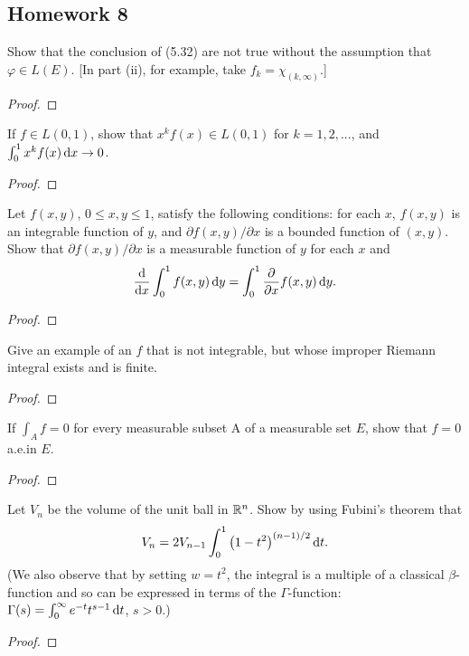 \subsection{Homework 8}
\begin{problem}
Show that the conclusion of (5.32) are not true without the assumption that
$\varphi\in L(E)$. [In part (ii), for example, take $f_k=\chi_{(k,\infty)}$.]
\end{problem}
\begin{proof}
\end{proof}

\begin{problem}
If $f\in L(0,1)$, show that $x^kf(x)\in L(0,1)$ for $k=1,2,...$, and
$\int_0^1 x^kf(x)\mathop{}\!\mathrm{d} x\to 0$.
\end{problem}
\begin{proof}
\end{proof}

\begin{problem}
Let $f(x,y)$, $0\leq x,y\leq 1$, satisfy the following conditions: for each
$x$, $f(x,y)$ is an integrable function of $y$, and
$\partial f(x,y)/\partial x$ is a bounded function of $(x,y)$. Show that
$\partial f(x,y)/\partial x$ is a measurable function of $y$ for each $x$
and
\[
  \frac{\mathrm{d}}{\mathrm{d} x}\int_0^1f(x,y)\mathop{}\!\mathrm{d} y=\int_0^1\frac{\partial}{\partial
    x}f(x,y)\mathop{}\!\mathrm{d} y.
\]
\end{problem}
\begin{proof}
\end{proof}

\begin{problem}
Give an example of an $f$ that is not integrable, but whose improper
Riemann integral exists and is finite.
\end{problem}
\begin{proof}
\end{proof}

\begin{problem}
If $\int_A f=0$ for every measurable subset A of a measurable set $E$, show
that $f=0$ a.e.\@ in $E$.
\end{problem}
\begin{proof}
\end{proof}

\begin{problem}
 Let $V_n$ be the volume of the unit ball in $\mathbb{R}^n$. Show by using
 Fubini's theorem that
\[
V_n=2V_{n-1}\int_0^1\left(1-t^2\right)^{(n-1)/2}\mathop{}\!\mathrm{d} t.
\]
(We also observe that by setting $w=t^2$, the integral is a multiple of a
classical $\beta$-function and so can be expressed in terms of the
$\Gamma$-function: $\Gamma(s)=\int_0^\infty e^{-t}t^{s-1}\mathop{}\!\mathrm{d} t$, $s>0$.)
\end{problem}
\begin{proof}
\end{proof}

